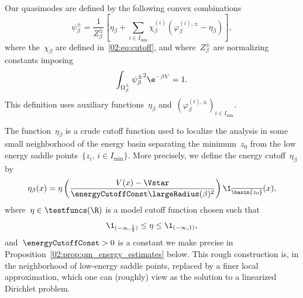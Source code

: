             Our quasimodes are defined by the following convex combinations
            \begin{equation}
                \label{02:eq:global_quasimode}
                \psi^{\pm}_\beta = \frac1{Z^{\pm}_\beta}\left[\eta_\beta+\sum_{i\in I_{\min}}\chi_\beta^{(i)}\left(\varphi_\beta^{(i),\pm}- \eta_\beta\right)\right],
            \end{equation}
            where the~$\chi_\beta$ are defined in~\eqref{02:eq:cutoff}, and where~$Z^{\pm}_\beta$ are normalizing constants imposing
            $$\int_{\Omega^\pm_\beta}{\psi_\beta^\pm}^2 \e^{-\beta V}=1.$$
            This definition uses auxiliary functions~$\eta_\beta$ and~$\left(\varphi_\beta^{(i),\pm}\right)_{i\in I_{\min}}$.
            
            The function~$\eta_\beta$ is a crude cutoff function used to localize the analysis in some small neighborhood of the energy basin separating the minimum~$z_0$ from the low energy saddle points~$\{z_i,\,i\in I_{\min}\}$.
            More precisely, we define the energy cutoff~$\eta_\beta$ by
            \begin{equation}
                \label{02:eq:energy_cutoff}
                \eta_\beta(x) = \eta\left(\frac{V(x)-\Vstar}{\energyCutoffConst \largeRadius(\beta)^2}\right)\1_{\overline{\basin{z_0}}}(x),
            \end{equation}
            where~$\eta\in\testfuncs(\R)$ is a model cutoff function chosen such that
            \begin{equation}
            \label{02:eq:eta_cutoff_def}
            \1_{(-\infty,\frac12)}\leq \eta\leq \1_{(-\infty,1)},
            \end{equation}
            and~$\energyCutoffConst>0$ is a constant we make precise in Proposition~\ref{02:prop:qm_energy_estimates} below.
            This rough construction is, in the neighborhood of low-energy saddle points, replaced by a finer local approximation, which one can (roughly) view as the solution to a linearized Dirichlet problem.

